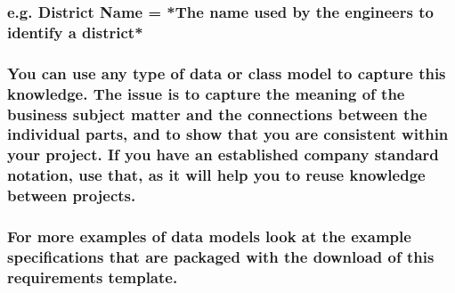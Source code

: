 \documentclass[
]{article}
\begin{document}
\hypertarget{e.g.-district-name-the-name-used-by-the-engineers-to-identify-a-district}{%
\subsubsection{e.g. District Name = *The name used by the engineers to
identify a
district*}\label{e.g.-district-name-the-name-used-by-the-engineers-to-identify-a-district}}

\hypertarget{you-can-use-any-type-of-data-or-class-model-to-capture-this-knowledge.-the-issue-is-to-capture-the-meaning-of-the-business-subject-matter-and-the-connections-between-the-individual-parts-and-to-show-that-you-are-consistent-within-your-project.-if-you-have-an-established-company-standard-notation-use-that-as-it-will-help-you-to-reuse-knowledge-between-projects.}{%
\subsubsection{\texorpdfstring{You can use any type of data or class
model to capture this knowledge. The issue is to capture the meaning of
the business subject matter and the connections between the individual
parts, and to show that you are consistent within your project. If you
have an established company standard notation, use that, as it will help
you to reuse knowledge between projects.
}{You can use any type of data or class model to capture this knowledge. The issue is to capture the meaning of the business subject matter and the connections between the individual parts, and to show that you are consistent within your project. If you have an established company standard notation, use that, as it will help you to reuse knowledge between projects. }}\label{you-can-use-any-type-of-data-or-class-model-to-capture-this-knowledge.-the-issue-is-to-capture-the-meaning-of-the-business-subject-matter-and-the-connections-between-the-individual-parts-and-to-show-that-you-are-consistent-within-your-project.-if-you-have-an-established-company-standard-notation-use-that-as-it-will-help-you-to-reuse-knowledge-between-projects.}}

\hypertarget{for-more-examples-of-data-models-look-at-the-example-specifications-that-are-packaged-with-the-download-of-this-requirements-template.}{%
\subsubsection{For more examples of data models look at the example
specifications that are packaged with the download of this requirements
template.}\label{for-more-examples-of-data-models-look-at-the-example-specifications-that-are-packaged-with-the-download-of-this-requirements-template.}}
\end{document}
